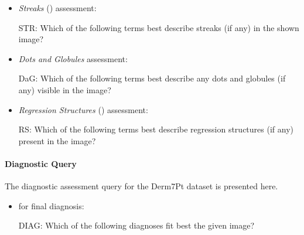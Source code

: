 \documentclass[../ShajiS_RnDReport.tex]{subfiles}
\begin{document}
\begin{itemize}
    \item \emph{Streaks} () assessment:
    \begin{promptbox}
    STR: Which of the following terms best describe streaks (if any) in the shown image? 
     \\
    \end{promptbox}

    \item \emph{Dots and Globules}  assessment:
    \begin{promptbox}
    DaG: Which of the following terms best describe any dots and globules (if any) visible in the image? 
     \\
    \end{promptbox}

    \item \emph{Regression Structures} () assessment:
    \begin{promptbox}
    RS: Which of the following terms best describe regression structures (if any) present in the image? 
     \\
    \end{promptbox}
\end{itemize}

\paragraph{Diagnostic Query}
\label{sec:appendix:prompts:derm:diagnostic}
The diagnostic assessment query for the Derm7Pt dataset is presented here.

\begin{itemize}
    \item {} for final diagnosis:
    \begin{promptbox}
    DIAG: Which of the following diagnoses fit best the given image? 
    \end{promptbox}
\end{itemize}
\end{document}
